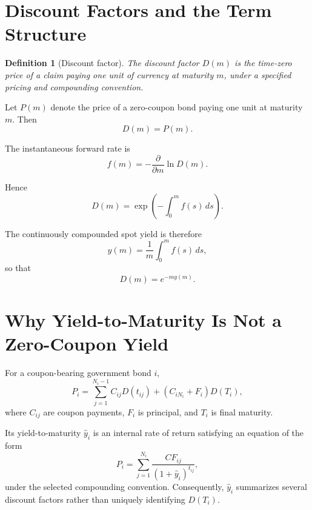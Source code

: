 \documentclass[a4paper,10pt]{article}
\newtheorem{definition}{Definition}[section]
\theoremstyle{remark}
\begin{document}
\section{Discount Factors and the Term Structure}

\begin{definition}[Discount factor]
The discount factor $D(m)$ is the time-zero price of a claim paying one unit of currency at maturity $m$, under a specified pricing and compounding convention.
\end{definition}

Let $P(m)$ denote the price of a zero-coupon bond paying one unit at maturity $m$. Then
\begin{equation}
D(m)=P(m).
\end{equation}

The instantaneous forward rate is
\begin{equation}
f(m)=-\frac{\partial}{\partial m}\ln D(m).
\end{equation}

Hence
\begin{equation}
D(m)=\exp\left(-\int_0^m f(s)\,ds\right).
\end{equation}

The continuously compounded spot yield is therefore
\begin{equation}
y(m)=\frac{1}{m}\int_0^m f(s)\,ds,
\end{equation}
so that
\begin{equation}
D(m)=e^{-m y(m)}.
\end{equation}

\section{Why Yield-to-Maturity Is Not a Zero-Coupon Yield}

For a coupon-bearing government bond $i$,
\begin{equation}
P_i=\sum_{j=1}^{N_i-1}C_{ij}D(t_{ij})+(C_{iN_i}+F_i)D(T_i),
\end{equation}
where $C_{ij}$ are coupon payments, $F_i$ is principal, and $T_i$ is final maturity.

Its yield-to-maturity $\hat y_i$ is an internal rate of return satisfying an equation of the form
\begin{equation}
P_i=\sum_{j=1}^{N_i}\frac{CF_{ij}}{(1+\hat y_i)^{t_{ij}}},
\end{equation}
under the selected compounding convention. Consequently, $\hat y_i$ summarizes several discount factors rather than uniquely identifying $D(T_i)$.
\end{document}
